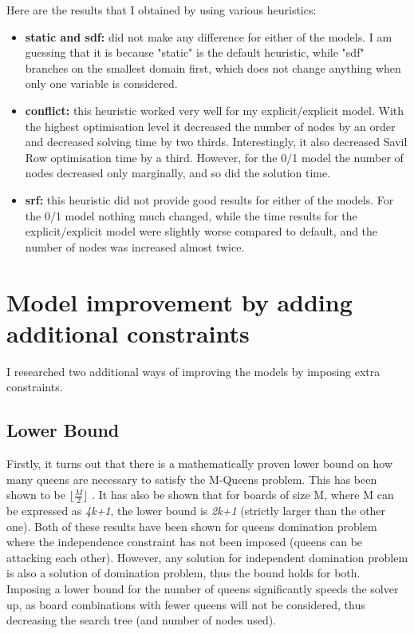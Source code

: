 \documentclass{report}
\newcommand{\tab}{\hspace*{1.5em}}
\begin{document}
Here are the results that I obtained by using various heuristics:
\begin{itemize}
\item \textbf{static and sdf:} did not make any difference for either of the models. I am guessing that it is because "static" is the default heuristic, while "sdf" branches on the smallest domain first, which does not change anything when only one variable is considered.
\item \textbf{conflict:} this heuristic worked very well for my explicit/explicit model. With the highest optimisation level it decreased the number of nodes by an order and decreased solving time by two thirds. Interestingly, it also decreased Savil Row optimisation time by a third. However, for the 0/1 model the number of nodes decreased only marginally, and so did the solution time.
\item \textbf{srf:} this heuristic did not provide good results for either of the models. For the 0/1 model nothing much changed, while the time results for the explicit/explicit model were slightly worse compared to default, and the number of nodes was increased almost twice.
\end{itemize} 

\section*{Model improvement by adding additional constraints}

\tab I researched two additional ways of improving the models by imposing extra constraints. 

\subsection*{Lower Bound}

Firstly, it turns out that there is a mathematically proven lower bound on how many queens are necessary to satisfy the M-Queens problem. This has been shown to be $\lfloor \frac{M}{2} \rfloor$ \cite{EJC}. It has also be shown that for boards of size M, where M can be expressed as \textit{4k+1}, the lower bound is \textit{2k+1} \cite{GW} (strictly larger than the other one). Both of these results have been shown for queens domination problem where the independence constraint has not been imposed (queens can be attacking each other). However, any solution for independent domination problem is also a solution of domination problem, thus the bound holds for both. Imposing a lower bound for the number of queens significantly speeds the solver up, as board combinations with fewer queens will not be considered, thus decreasing the search tree (and number of nodes used).
\end{document}
